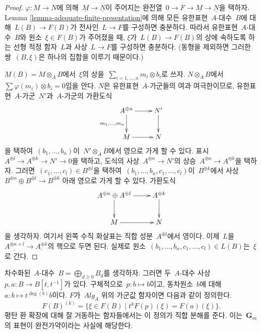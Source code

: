 \begin{proof}
$\varphi : M \to N$에 의해\ 
$\underline{M} \to \underline{N}$이 주어지는 완전열\ 
$0 \to F \to \underline{M} \to \underline{N}$을 택하자.
Lemma \ref{lemma-adequate-finite-presentation}에 의해 모든
유한표현\  $A$-대수\  $B$에 대해\  $L(B) \to F(B)$가 전사인\ 
$L \to F$를 구성하면 충분하다. 따라서 유한표현\  $A$-대수\  $B$와
원소\  $\xi \in F(B)$가 주어졌을 때, $\xi$가\  $L(B) \to F(B)$의
상에 속하도록 하는 선형 적정 함자\  $L$과 사상\  $L \to F$를
구성하면 충분하다.
(동형을 제외하면 그러한 쌍\  $(B, \xi)$은 하나의 집합을 이루기
때문이다.)

\medskip\noindent
$\underline{M}(B) = M \otimes_A B$에서\  $\xi$의 상을\ 
$\sum_{i = 1, \ldots, n} m_i \otimes b_i$로 쓰자.
$N \otimes_A B$에서\ 
$\sum \varphi(m_i) \otimes b_i = 0$임을 안다. $N$은 유한표현\ 
$A$-가군들의 여과 여극한이므로, 유한표현\  $A$-가군\  $N'$과\ 
$A$-가군의 가환도식
$$
\xymatrix{
A^{\oplus n} \ar[r] \ar[d]_{m_1, \ldots, m_n} & N' \ar[d] \\
M \ar[r] & N
}
$$
을 택하여\  $(b_1, \ldots, b_n)$이\  $N' \otimes_A B$에서 영으로
가게 할 수 있다. 표시\ 
$A^{\oplus l} \to A^{\oplus k} \to N' \to 0$을 택하고, 도식의
사상\  $A^{\oplus n} \to N'$의 상승\ 
$A^{\oplus n} \to A^{\oplus k}$을 택하자. 그러면\ 
$(c_1, \ldots, c_l) \in B^{\oplus l}$을 택하여\ 
$(b_1, \ldots, b_n, c_1, \ldots, c_l)$이\ 
$B^{\oplus k}$에서 사상\ 
$B^{\oplus n} \oplus B^{\oplus l} \to B^{\oplus k}$ 아래 영으로
가게 할 수 있다.
가환도식
$$
\xymatrix{
A^{\oplus n} \oplus A^{\oplus l} \ar[r] \ar[d] & A^{\oplus k} \ar[d] \\
M \ar[r] & N
}
$$
을 생각하자. 여기서 왼쪽 수직 화살표는 직합 성분\ 
$A^{\oplus l}$에서 영이다. 이제\ 
$L$을\ 
$\underline{A^{\oplus n + l}}
\to \underline{A^{\oplus k}}$의 핵으로 두면 된다. 실제로 원소\ 
$(b_1, \ldots, b_n, c_1, \ldots, c_l) \in L(B)$는\  $\xi$로
간다.
\end{proof}

\noindent
차수화된\  $A$-대수\  $B = \bigoplus_{d \geq 0} B_d$를 생각하자. 그러면
두\  $A$-대수 사상\  $p, a : B \to B[t, t^{-1}]$가 있다. 구체적으로\ 
$p : b \mapsto b$이고, 동차원소\  $b$에 대해\ 
$a : b \mapsto t^{\deg(b)} b$이다. $F$가\  $\textit{Alg}_A$ 위의
가군값 함자이면 다음과 같이 정의한다.
\begin{equation}
\label{equation-weight-k}
F(B)^{(k)} = \{\xi \in F(B) \mid t^k F(p)(\xi) = F(a)(\xi)\}.
\end{equation}
평탄 환 확장에 대해 잘 거동하는 함자들에서는 이 정의가 직합 분해를
준다. 이는\  $\mathbf{G}_m$의 표현이 완전가약이라는 사실에 해당한다.

